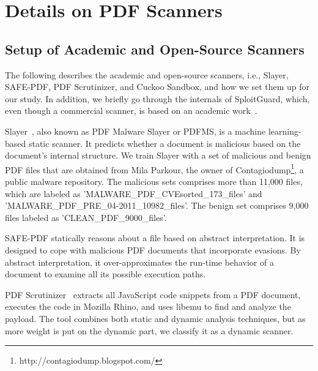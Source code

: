 \section{Details on PDF Scanners}

\subsection{Setup of Academic and Open-Source Scanners}
\label{sec:scanner setup}

The following describes the academic and open-source scanners, i.e.,
Slayer, SAFE-PDF, PDF Scrutinizer, and Cuckoo Sandbox,
and how we set them up for our study.
In addition, we briefly go through the internals of SploitGuard, which, even though a commercial scanner, is based on an  academic work~\cite{payer2015fine}.

Slayer~\cite{maiorca2012pattern}, also known as PDF Malware Slayer or PDFMS, is a machine learning-based static scanner. It predicts whether a document is malicious based on the document's internal structure.
We train Slayer with a set of malicious and benign PDF files that are obtained from Mila Parkour, the owner of Contagiodump\footnote{http://contagiodump.blogspot.com/}, a public malware repository.
The malicious sets comprises more than 11,000 files, which are labeled as 'MALWARE\_PDF\_CVEsorted\_173\_files' and 'MALWARE\_PDF\_PRE\_04-2011\_10982\_files'.
The benign set comprises 9,000 files labeled as 'CLEAN\_PDF\_9000\_files'.

SAFE-PDF statically reasons about a file based on abstract interpretation. 
It is designed to cope with malicious PDF documents that incorporate evasions.
By abstract interpretation, it over-approximates the run-time behavior of a document to examine all its possible execution paths.

PDF Scrutinizer~\cite{schmitt2012pdf} extracts all JavaScript code snippets from a PDF document, executes the code in Mozilla Rhino, and uses libemu to find and analyze the payload.
The tool combines both static and dynamic analysis techniques, but as more weight is put on the dynamic part, we classify it as a dynamic scanner.


